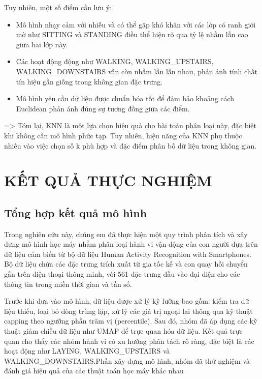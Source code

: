 \documentclass[
]{article}
\begin{document}
Tuy nhiên, một số điểm cần lưu ý:

\begin{itemize}
\item
  Mô hình nhạy cảm với nhiễu và có thể gặp khó khăn với các lớp có ranh
  giới mờ như SITTING và STANDING điều thể hiện rõ qua tỷ lệ nhầm lẫn
  cao giữa hai lớp này.
\item
  Các hoạt động động như WALKING, WALKING\_UPSTAIRS, WALKING\_DOWNSTAIRS
  vẫn còn nhầm lẫn lẫn nhau, phản ánh tính chất tín hiệu gần giống trong
  không gian đặc trưng.
\item
  Mô hình yêu cầu dữ liệu được chuẩn hóa tốt để đảm bảo khoảng cách
  Euclidean phản ánh đúng sự tương đồng giữa các điểm.
\end{itemize}

=\textgreater{} Tóm lại, KNN là một lựa chọn hiệu quả cho bài toán phân
loại này, đặc biệt khi không cần mô hình phức tạp. Tuy nhiên, hiệu năng
của KNN phụ thuộc nhiều vào việc chọn số k phù hợp và đặc điểm phân bố
dữ liệu trong không gian.

\newpage

\section{KẾT QUẢ THỰC
NGHIỆM}\label{kux1ebft-quux1ea3-thux1ef1c-nghiux1ec7m}

\subsection{Tổng hợp kết quả mô
hình}\label{tux1ed5ng-hux1ee3p-kux1ebft-quux1ea3-muxf4-huxecnh}

Trong nghiên cứu này, chúng em đã thực hiện một quy trình phân tích và
xây dựng mô hình học máy nhằm phân loại hành vi vận động của con người
dựa trên dữ liệu cảm biến từ bộ dữ liệu Human Activity Recognition with
Smartphones. Bộ dữ liệu chứa các đặc trưng trích xuất từ gia tốc kế và
con quay hồi chuyển gắn trên điện thoại thông minh, với 561 đặc trưng
đầu vào đại diện cho các thông tin trong miền thời gian và tần số.

Trước khi đưa vào mô hình, dữ liệu được xử lý kỹ lưỡng bao gồm: kiểm tra
dữ liệu thiếu, loại bỏ dòng trùng lặp, xử lý các giá trị ngoại lai thông
qua kỹ thuật capping theo ngưỡng phần trăm vị (percentile). Sau đó, nhóm
đã áp dụng các kỹ thuật giảm chiều dữ liệu như UMAP để trực quan hóa dữ
liệu. Kết quả trực quan cho thấy các nhóm hành vi có xu hướng phân tách
rõ ràng, đặc biệt là các hoạt động như LAYING, WALKING\_UPSTAIRS và
WALKING\_DOWNSTAIRS.Phần xây dựng mô hình, nhóm đã thử nghiệm và đánh
giá hiệu quả của các thuật toán học máy khác nhau
\end{document}
